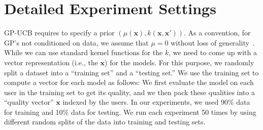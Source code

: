 \documentclass[letterpaper]{vldb}
\newcommand{\eml}{\texttt{ease.ml}\xspace}
\begin{document}
%





  



%
%
%
%
%
%
%
%
%
%
%
%
%
%
%
%
%
%
%
%
%
%
%
%
%
%
%
%
%
%
%
%
%
%
%
%
%
%
%
%
%
%
%
%
%
%



\iffalse

\appendix


\section{Detailed Experiment Settings}

GP-UCB requires to specify a prior $(\mu(\mathbf{x}), k(\mathbf{x},\mathbf{x}'))$.
As a convention, for GP's not conditioned on data, we assume that $\mu=0$ without loss of generality~\cite{SrinivasKKS10}.
While we can use standard kernel functions for the $k$, we need to come up with a vector representation (i.e., the $\mathbf{x}$) for the models.
For this purpose, we randomly split a dataset into a ``training set'' and a ``testing set.''
We use the training set to compute a vector for each model as follows:
We first evaluate the model on each user in the training set to get its quality, and we then pack these qualities into a ``quality vector'' $\mathbf{x}$ indexed by the users.
In our experiments, we used 90\% data for training and 10\% data for testing.
We run each experiment 50 times by using different random splits of the data into training and testing sets.
\end{document}
